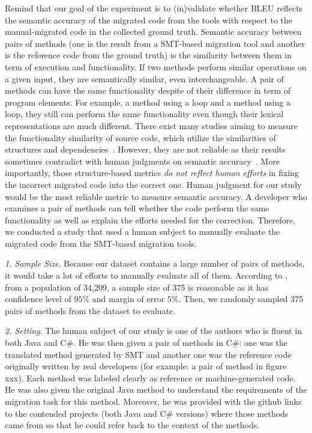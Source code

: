 Remind that our goal of the experiment is to (in)validate whether BLEU
reflects the semantic accuracy of the migrated code from the tools
with respect to the manual-migrated code in the collected ground
truth. 
%
Semantic accuracy between pairs of methods (one is the result from a
SMT-based migration tool and another is the reference code from the
ground truth) is the similarity between them in term of execution and
functionality. If two methods perform similar operations on a given
input, they are semantically similar, even interchangeable. A pair of
methods can have the same functionality despite of their difference in
term of program elements.
%
For example, a method using a  loop and a method using a
 loop, they still can perform the same functionality even
though their lexical representations are much different. There exist
many studies aiming to measure the functionality similarity of source
code, which utilize the similarities of structures and
dependencies~\cite{clone-tse07,roy09,ducasse99,baker97,ccfinder,cpminer,baxter98,deckard,deckard2,horwitz01}.
%
However, they are not reliable as their results sometimes contradict
with human judgments on semantic accuracy~\cite{fse14-higo}. More
importantly, those structure-based metrics {\em do not reflect human
  efforts} in fixing the incorrect migrated code into the correct one.
%
Human judgment for our study would be the most reliable metric to
measure semantic accuracy. A developer who examines a pair of methods
can tell whether the code perform the same functionality as well as
explain the efforts needed for the correction. Therefore, we conducted
a study that used a human subject to manually evaluate the migrated
code from the SMT-based migration tools.


\emph{1. Sample Size}. Because our dataset contains a large number of pairs of methods, it would take a lot of efforts to manually evaluate all of them. According to \cite{website}, from a population of 34,209, a sample size of 375 is reasonable as it has confidence level of $95\%$ and margin of error $5\%$. Then, we randomly sampled 375 pairs of methods from the dataset to evaluate. 

\emph{2. Setting}. The human subject of our study is one of the authors who is fluent in both Java and C\#. He was then given a pair of methods in C\#: one was the translated method generated by SMT and another one was the reference code originally written by real developers (for example: a pair of method in figure xxx). Each method was labeled clearly as reference or machine-generated code. He was also given the original Java method to understand the requirements of the migration task for this method. Moreover, he was provided with the github links to the contended projects (both Java and C\# versions) where those methods came from so that he could refer back to the context of the methods.

